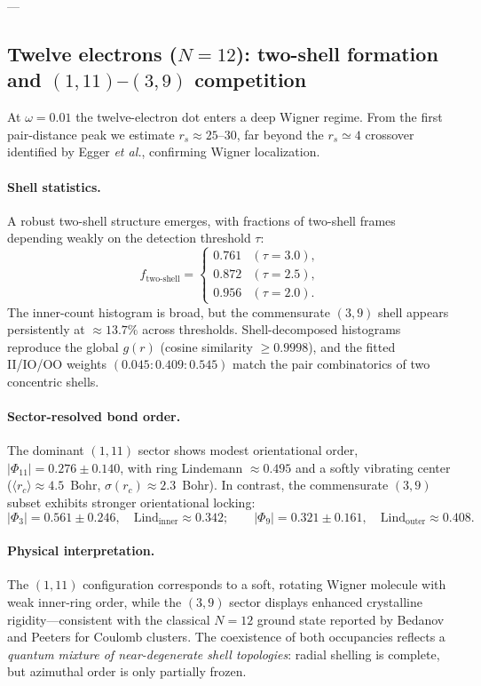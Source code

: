 ---

\subsection{Twelve electrons ($N=12$): two-shell formation and $(1,11)$–$(3,9)$ competition}

At $\omega=0.01$ the twelve-electron dot enters a deep Wigner regime.  
From the first pair-distance peak we estimate $r_s\!\approx\!25$–$30$, far beyond the $r_s\simeq4$ crossover identified by Egger \emph{et al.}, confirming Wigner localization.

\paragraph{Shell statistics.}
A robust two-shell structure emerges, with fractions of two-shell frames depending weakly on the detection threshold $\tau$:
\[
f_{\text{two-shell}}=
\begin{cases}
0.761 & (\tau=3.0),\\
0.872 & (\tau=2.5),\\
0.956 & (\tau=2.0).
\end{cases}
\]
The inner-count histogram is broad, but the commensurate $(3,9)$ shell appears persistently at $\approx13.7\%$ across thresholds.  
Shell-decomposed histograms reproduce the global $g(r)$ (cosine similarity $\ge0.9998$), and the fitted II/IO/OO weights $(0.045{:}0.409{:}0.545)$ match the pair combinatorics of two concentric shells.

\paragraph{Sector-resolved bond order.}
The dominant $(1,11)$ sector shows modest orientational order, $|\Phi_{11}|=0.276\pm0.140$, with ring Lindemann $\approx0.495$ and a softly vibrating center ($\langle r_c\rangle\!\approx\!4.5$~Bohr, $\sigma(r_c)\!\approx\!2.3$~Bohr).  
In contrast, the commensurate $(3,9)$ subset exhibits stronger orientational locking:
\[
|\Phi_3|=0.561\pm0.246, \quad \text{Lind}_{\text{inner}}\!\approx\!0.342; \qquad
|\Phi_9|=0.321\pm0.161, \quad \text{Lind}_{\text{outer}}\!\approx\!0.408.
\]

\paragraph{Physical interpretation.}
The $(1,11)$ configuration corresponds to a soft, rotating Wigner molecule with weak inner-ring order, while the $(3,9)$ sector displays enhanced crystalline rigidity—consistent with the classical $N{=}12$ ground state reported by Bedanov and Peeters for Coulomb clusters.  
The coexistence of both occupancies reflects a \emph{quantum mixture of near-degenerate shell topologies}: radial shelling is complete, but azimuthal order is only partially frozen.

